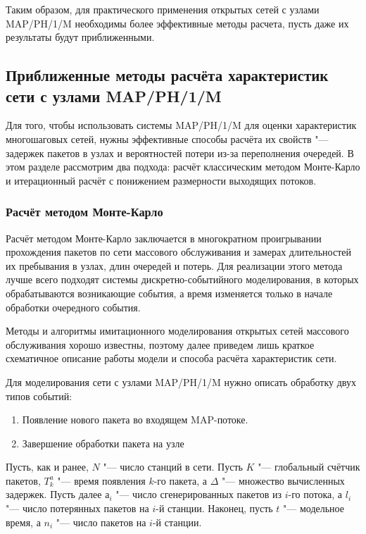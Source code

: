 Таким образом, для практического применения открытых сетей с узлами MAP/PH/1/M необходимы более эффективные методы расчета, пусть даже их результаты будут приближенными.




\subsection{Приближенные методы расчёта характеристик сети с узлами MAP/PH/1/M}

Для того, чтобы использовать системы MAP/PH/1/M для оценки характеристик многошаговых сетей, нужны эффективные способы расчёта их свойств "--- задержек пакетов в узлах и вероятностей потери из-за переполнения очередей. В этом разделе рассмотрим два подхода: расчёт классическим методом Монте-Карло и итерационный расчёт с понижением размерности выходящих потоков.


\subsubsection{Расчёт методом Монте-Карло}
Расчёт методом Монте-Карло заключается в многократном проигрывании прохождения пакетов по сети массового обслуживания и замерах длительностей их пребывания в узлах, длин очередей и потерь. Для реализации этого метода лучше всего подходят системы дискретно-событийного моделирования, в которых обрабатываются возникающие события, а время изменяется только в начале обработки очередного события.

Методы и алгоритмы имитационного моделирования открытых сетей массового обслуживания хорошо известны, поэтому далее приведем лишь краткое схематичное описание работы модели и способа расчёта характеристик сети.

Для моделирования сети с узлами MAP/PH/1/M нужно описать обработку двух типов событий:

\begin{enumerate}
\item Появление нового пакета во входящем MAP-потоке.
\item Завершение обработки пакета на узле
\end{enumerate}

Пусть, как и ранее, $N$ "--- число станций в сети. Пусть $K$ "--- глобальный счётчик пакетов, $T_k^a$ "--- время появления $k$-го пакета, а $\Delta$ "--- множество вычисленных задержек. Пусть далее $а_i$ "--- число сгенерированных пакетов из $i$-го потока, а $l_i$ "--- число потерянных пакетов на $i$-й станции. Наконец, пусть $t$ "--- модельное время, а $n_i$ "--- число пакетов на $i$-й станции.

